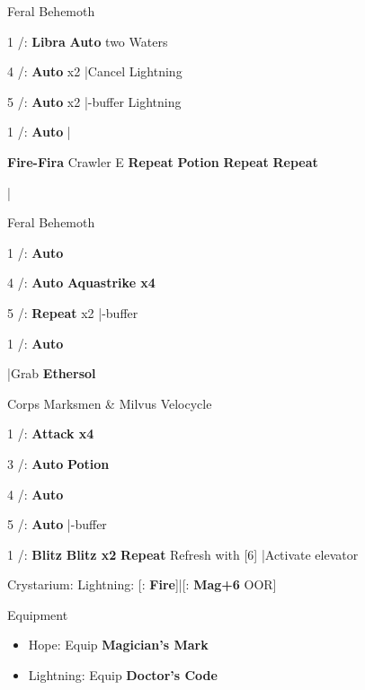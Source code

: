 \begin{fight}{Feral Behemoth}
	\item [1] \rav/\com: \textbf{Libra} \to \textbf{Auto} two Waters
	\item [4] \rav/\rav: \textbf{Auto} x2 |Cancel Lightning
	\item [5] \rav/\rav: \textbf{Auto} x2 |\com-buffer Lightning
	\item [1] \rav/\com: \textbf{Auto} |\skip
\end{fight}
\begin{mainlist}
	\item {} \textbf{Fire-Fira} Crawler E \to [6] \textbf{Repeat} \to \textbf{\textbf{Potion}} \to \textbf{Repeat} \to [1] \textbf{Repeat}
	\item {}|
\end{mainlist}
\begin{fight}{Feral Behemoth}
	\item [1] \com/\rav: \textbf{Auto}
	\item [4] \rav/\rav: \textbf{Auto} \to \textbf{Aquastrike x4}
	\item [5] \rav/\rav: \textbf{Repeat} x2 |\com-buffer
	\item [1] \com/\rav: \textbf{Auto}
\end{fight}
\begin{mainlist}
	\item \skip|Grab \textbf{Ethersol}
\end{mainlist}
\begin{fight}{Corps Marksmen \& Milvus Velocycle}
	\item [1] \com/\rav: \textbf{Attack x4}
	\item [3] \rav/\syn: \textbf{Auto} \to \textbf{\textbf{Potion}}
	\item [4] \rav/\rav: \textbf{Auto}
	\item [5] \rav/\rav: \textbf{Auto} |\com-buffer
	\item [1] \com/\rav: \textbf{Blitz} \to \textbf{Blitz x2} \to \textbf{Repeat} \to Refresh with [6] |Activate elevator
\end{fight}
\begin{menu}
	\item Crystarium: Lightning: [\rav: \textbf{Fire}]|[\com: \textbf{Mag+6} OOR]
	\item Equipment
	\begin{itemize}
		\item Hope: Equip \textbf{Magician's Mark}
		\item Lightning: Equip \textbf{Doctor's Code}
	\end{itemize}
\end{menu}
